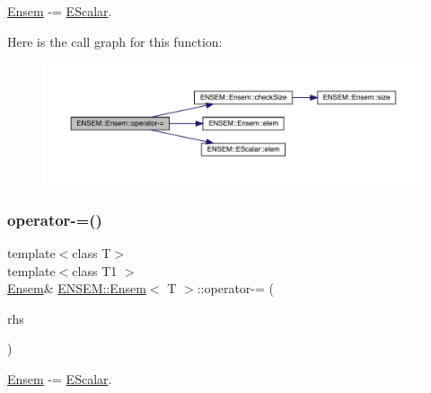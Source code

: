 \mbox{\hyperlink{classENSEM_1_1Ensem}{Ensem}} -\/= \mbox{\hyperlink{classENSEM_1_1EScalar}{E\+Scalar}}. 

Here is the call graph for this function\+:
\nopagebreak
\begin{figure}[H]
\begin{center}
\leavevmode
\includegraphics[width=350pt]{d7/d3e/classENSEM_1_1Ensem_a33710df08404883ee7790d2b67542971_cgraph}
\end{center}
\end{figure}
\mbox{\label{classENSEM_1_1Ensem_a33710df08404883ee7790d2b67542971}} 
\subsubsection{\texorpdfstring{operator-\/=()}{operator-=()}\hspace{0.1cm}{\footnotesize\ttfamily [2/6]}}
{\footnotesize\ttfamily template$<$class T$>$ \\
template$<$class T1 $>$ \\
\mbox{\hyperlink{classENSEM_1_1Ensem}{Ensem}}\& \mbox{\hyperlink{classENSEM_1_1Ensem}{E\+N\+S\+E\+M\+::\+Ensem}}$<$ T $>$\+::operator-\/= (\begin{DoxyParamCaption}\item[{const \mbox{\hyperlink{classENSEM_1_1EScalar}{E\+Scalar}}$<$ T1 $>$ \&}]{rhs }\end{DoxyParamCaption})\hspace{0.3cm}{\ttfamily [inline]}}



\mbox{\hyperlink{classENSEM_1_1Ensem}{Ensem}} -\/= \mbox{\hyperlink{classENSEM_1_1EScalar}{E\+Scalar}}. 

